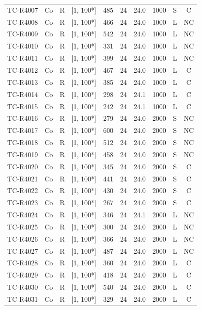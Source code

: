 \begin{longtable}{lccccccccc}
TC-R4007 & Co & R & [1, 100*] & 485 & 24 & 24.0 & 1000 & S & C \\
TC-R4008 & Co & R & [1, 100*] & 466 & 24 & 24.0 & 1000 & L & NC \\
TC-R4009 & Co & R & [1, 100*] & 542 & 24 & 24.0 & 1000 & L & NC \\
TC-R4010 & Co & R & [1, 100*] & 331 & 24 & 24.0 & 1000 & L & NC \\
TC-R4011 & Co & R & [1, 100*] & 399 & 24 & 24.0 & 1000 & L & NC \\
TC-R4012 & Co & R & [1, 100*] & 467 & 24 & 24.0 & 1000 & L & C \\
TC-R4013 & Co & R & [1, 100*] & 385 & 24 & 24.0 & 1000 & L & C \\
TC-R4014 & Co & R & [1, 100*] & 298 & 24 & 24.1 & 1000 & L & C \\
TC-R4015 & Co & R & [1, 100*] & 242 & 24 & 24.1 & 1000 & L & C \\
TC-R4016 & Co & R & [1, 100*] & 279 & 24 & 24.0 & 2000 & S & NC \\
TC-R4017 & Co & R & [1, 100*] & 600 & 24 & 24.0 & 2000 & S & NC \\
TC-R4018 & Co & R & [1, 100*] & 512 & 24 & 24.0 & 2000 & S & NC \\
TC-R4019 & Co & R & [1, 100*] & 458 & 24 & 24.0 & 2000 & S & NC \\
TC-R4020 & Co & R & [1, 100*] & 345 & 24 & 24.0 & 2000 & S & C \\
TC-R4021 & Co & R & [1, 100*] & 441 & 24 & 24.0 & 2000 & S & C \\
TC-R4022 & Co & R & [1, 100*] & 430 & 24 & 24.0 & 2000 & S & C \\
TC-R4023 & Co & R & [1, 100*] & 267 & 24 & 24.0 & 2000 & S & C \\
TC-R4024 & Co & R & [1, 100*] & 346 & 24 & 24.1 & 2000 & L & NC \\
TC-R4025 & Co & R & [1, 100*] & 300 & 24 & 24.0 & 2000 & L & NC \\
TC-R4026 & Co & R & [1, 100*] & 366 & 24 & 24.0 & 2000 & L & NC \\
TC-R4027 & Co & R & [1, 100*] & 487 & 24 & 24.0 & 2000 & L & NC \\
TC-R4028 & Co & R & [1, 100*] & 360 & 24 & 24.0 & 2000 & L & C \\
TC-R4029 & Co & R & [1, 100*] & 418 & 24 & 24.0 & 2000 & L & C \\
TC-R4030 & Co & R & [1, 100*] & 540 & 24 & 24.0 & 2000 & L & C \\
TC-R4031 & Co & R & [1, 100*] & 329 & 24 & 24.0 & 2000 & L & C \\

\end{longtable}
